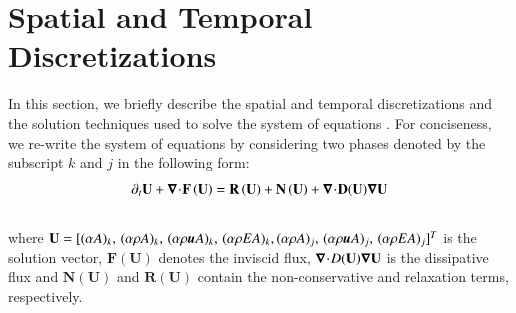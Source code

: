 \documentclass[preprint,10pt]{elsarticle}
\begin{document}
\section{Spatial and Temporal Discretizations} \label{sec:disc}
%
In this section, we briefly describe the spatial and temporal discretizations and the solution techniques 
used to solve the system of equations . For conciseness, we re-write the system of 
equations by considering two phases denoted by the subscript $k$ and $j$ in the following form:
\begin{equation}
\label{eq:form}
\partial_t \mathbf{U} + \boldsymbol\nabla\! \cdot \! \mathbf{F} \left( \mathbf{U} \right) = \mathbf{R} \left( \mathbf{U} \right) + \mathbf{N} \left( \mathbf{U} \right) + \boldsymbol\nabla\! \cdot \! 
\mathbf{D}(\mathbf{U}) \boldsymbol\nabla \mathbf{U}
\end{equation}
\\
where $\mathbf{U}=[(\alpha A )_k, \, (\alpha \rho A)_k,\, (\alpha \rho \boldsymbol u A)_k,\, (\alpha \rho E A)_k, (\alpha \rho A)_j,\, (\alpha \rho \boldsymbol u A)_j,\, (\alpha \rho E A)_j]^T$ is the solution vector, $\mathbf{F} 
\left( \mathbf{U} \right)$ denotes 
the inviscid flux, $\boldsymbol\nabla\! \cdot \! D (\mathbf{U}) \boldsymbol\nabla \mathbf{U}$ is the dissipative flux and $\mathbf{N} \left( \mathbf{U} \right)$ and $\mathbf{R} 
\left( \mathbf{U} \right)$ contain the non-conservative and relaxation terms, respectively. 
\end{document}
